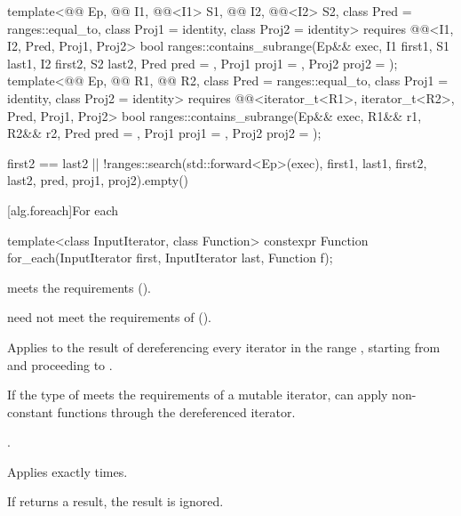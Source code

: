 \begin{itemdecl}
template<@@ Ep, @@ I1, @@<I1> S1,
         @@ I2, @@<I2> S2,
         class Pred = ranges::equal_to, class Proj1 = identity, class Proj2 = identity>
  requires @@<I1, I2, Pred, Proj1, Proj2>
  bool ranges::contains_subrange(Ep&& exec, I1 first1, S1 last1, I2 first2, S2 last2,
                                 Pred pred = {}, Proj1 proj1 = {}, Proj2 proj2 = {});
template<@@ Ep, @@ R1, @@ R2,
         class Pred = ranges::equal_to, class Proj1 = identity, class Proj2 = identity>
  requires @@<iterator_t<R1>, iterator_t<R2>, Pred, Proj1, Proj2>
  bool ranges::contains_subrange(Ep&& exec, R1&& r1, R2&& r2, Pred pred = {},
                                 Proj1 proj1 = {}, Proj2 proj2 = {});
\end{itemdecl}

\begin{itemdescr}
\pnum
\returns
\begin{codeblock}
first2 == last2 || !ranges::search(std::forward<Ep>(exec), first1, last1,
                                   first2, last2, pred, proj1, proj2).empty()
\end{codeblock}
\end{itemdescr}

[alg.foreach]{For each}

%
\begin{itemdecl}
template<class InputIterator, class Function>
  constexpr Function for_each(InputIterator first, InputIterator last, Function f);
\end{itemdecl}

\begin{itemdescr}
\pnum
\expects
{} meets
the  requirements ().
\begin{note}
 need not meet the requirements of
 ().
\end{note}

\pnum
\effects
Applies  to the result of dereferencing
every iterator in the range ,
starting from  and proceeding to .
\begin{note}
If the type of  meets the requirements of a mutable iterator,
 can apply non-constant functions through the dereferenced iterator.
\end{note}

\pnum
\returns
{}.

\pnum
\complexity
Applies  exactly  times.

\pnum
\remarks
If  returns a result, the result is ignored.
\end{itemdescr}

